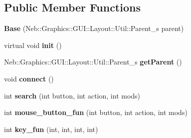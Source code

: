 \subsection*{\-Public \-Member \-Functions}
\begin{DoxyCompactItemize}
\item 
\hypertarget{classNeb_1_1Graphics_1_1GUI_1_1Layout_1_1Base_a1b2f473c9113eece88467beca024a215}{{\bfseries \-Base} (\-Neb\-::\-Graphics\-::\-G\-U\-I\-::\-Layout\-::\-Util\-::\-Parent\-\_\-s parent)}\label{classNeb_1_1Graphics_1_1GUI_1_1Layout_1_1Base_a1b2f473c9113eece88467beca024a215}

\item 
\hypertarget{classNeb_1_1Graphics_1_1GUI_1_1Layout_1_1Base_af57009f89ad7fc0e75500aead3299641}{virtual void {\bfseries init} ()}\label{classNeb_1_1Graphics_1_1GUI_1_1Layout_1_1Base_af57009f89ad7fc0e75500aead3299641}

\item 
\hypertarget{classNeb_1_1Graphics_1_1GUI_1_1Layout_1_1Base_af784b6ba641476e369e1665766a6f6a3}{\-Neb\-::\-Graphics\-::\-G\-U\-I\-::\-Layout\-::\-Util\-::\-Parent\-\_\-s {\bfseries get\-Parent} ()}\label{classNeb_1_1Graphics_1_1GUI_1_1Layout_1_1Base_af784b6ba641476e369e1665766a6f6a3}

\item 
\hypertarget{classNeb_1_1Graphics_1_1GUI_1_1Layout_1_1Base_ae427bfc003d7f02081ec340790dedba5}{void {\bfseries connect} ()}\label{classNeb_1_1Graphics_1_1GUI_1_1Layout_1_1Base_ae427bfc003d7f02081ec340790dedba5}

\item 
\hypertarget{classNeb_1_1Graphics_1_1GUI_1_1Layout_1_1Base_aa51592ea353a7921c9172bcd612047a4}{int {\bfseries search} (int button, int action, int mods)}\label{classNeb_1_1Graphics_1_1GUI_1_1Layout_1_1Base_aa51592ea353a7921c9172bcd612047a4}

\item 
\hypertarget{classNeb_1_1Graphics_1_1GUI_1_1Layout_1_1Base_a3207514a6c4b8be12165a930de390ebb}{int {\bfseries mouse\-\_\-button\-\_\-fun} (int button, int action, int mods)}\label{classNeb_1_1Graphics_1_1GUI_1_1Layout_1_1Base_a3207514a6c4b8be12165a930de390ebb}

\item 
\hypertarget{classNeb_1_1Graphics_1_1GUI_1_1Layout_1_1Base_a7da0d6f91d6db9e6d91cbd938b36d9d7}{int {\bfseries key\-\_\-fun} (int, int, int, int)}\label{classNeb_1_1Graphics_1_1GUI_1_1Layout_1_1Base_a7da0d6f91d6db9e6d91cbd938b36d9d7}

\end{DoxyCompactItemize}
